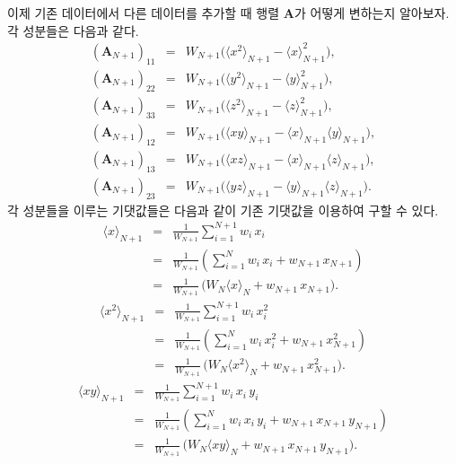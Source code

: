 \documentclass[chapter,a4paper,10pt]{oblivoir}
\begin{document}
이제 기존 데이터에서 다른 데이터를 추가할 때 행렬 $\mathbf{A}$가 어떻게 변하는지 알아보자. 각 성분들은 다음과 같다.
\begin{eqnarray}
\left(\mathbf{A}_{N+1}\right)_{11} &=& W_{N+1}\Big(\langle x^2 \rangle_{N+1} -\langle x \rangle_{N+1}^2\Big), \\
\left(\mathbf{A}_{N+1}\right)_{22} &=& W_{N+1}\Big(\langle y^2 \rangle_{N+1} -\langle y \rangle_{N+1}^2\Big), \\
\left(\mathbf{A}_{N+1}\right)_{33} &=& W_{N+1}\Big(\langle z^2 \rangle_{N+1} -\langle z \rangle_{N+1}^2\Big), \\
\left(\mathbf{A}_{N+1}\right)_{12} &=& W_{N+1} \Big(\langle xy \rangle_{N+1} -\langle x \rangle_{N+1}\langle y \rangle_{N+1} \Big), \\
\left(\mathbf{A}_{N+1}\right)_{13} &=& W_{N+1} \Big(\langle xz \rangle_{N+1} -\langle x \rangle_{N+1}\langle z \rangle_{N+1} \Big), \\
\left(\mathbf{A}_{N+1}\right)_{23} &=& W_{N+1} \Big(\langle yz \rangle_{N+1} -\langle y \rangle_{N+1}\langle z \rangle_{N+1} \Big).
\end{eqnarray}
각 성분들을 이루는 기댓값들은 다음과 같이 기존 기댓값을 이용하여 구할 수 있다.
\begin{eqnarray}
\langle x \rangle_{N+1} &=& \frac{1}{W_{N+1}}\sum_{i=1}^{N+1}w_i\,x_i \\
&=& \frac{1}{W_{N+1}}\left(\sum_{i=1}^{N}w_i\,x_i + w_{N+1}\,x_{N+1}\right)\nonumber\\
&=& \frac{1}{W_{N+1}}\,\Big(W_N\langle x \rangle_N + w_{N+1}\,x_{N+1}\Big).\nonumber
\end{eqnarray}
\begin{eqnarray}
\langle x^2 \rangle_{N+1} &=& \frac{1}{W_{N+1}}\sum_{i=1}^{N+1}w_i\,x_i^2 \\
&=& \frac{1}{W_{N+1}}\left(\sum_{i=1}^{N}w_i\,x_i^2 + w_{N+1}\,x_{N+1}^2\right)\nonumber\\
&=& \frac{1}{W_{N+1}}\,\Big(W_N\langle x^2 \rangle_N + w_{N+1}\,x_{N+1}^2\Big).\nonumber
\end{eqnarray}
\begin{eqnarray}
\langle xy \rangle_{N+1} &=& \frac{1}{W_{N+1}}\sum_{i=1}^{N+1}w_i\,x_i\,y_i \\
&=& \frac{1}{W_{N+1}}\left(\sum_{i=1}^{N}w_i\,x_i\,y_i + w_{N+1}\,x_{N+1}\,y_{N+1}\right)\nonumber\\
&=& \frac{1}{W_{N+1}}\,\Big(W_N\langle xy \rangle_N + w_{N+1}\,x_{N+1}\,y_{N+1}\Big).\nonumber
\end{eqnarray}
\end{document}
